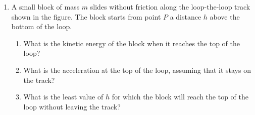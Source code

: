\documentclass{../../../oss-apphys}
\begin{document}
\begin{enumerate}[leftmargin=15pt]
  \newpage
  
\item A small block of mass $m$ slides without friction along the loop-the-loop
  track shown in the figure. The block starts from point $P$ a distance $h$
  above the bottom of the loop.
  \begin{center}
  \end{center}
  \begin{enumerate}[nosep]
  \item What is the kinetic energy of the block when it reaches the top of
    the loop?
  \item What is the acceleration at the top of the loop, assuming that it
    stays on the track?
  \item What is the least value of $h$ for which the block will reach the top
    of the loop without leaving the track?
  \end{enumerate}
  \newpage


\end{enumerate}
\end{document}

